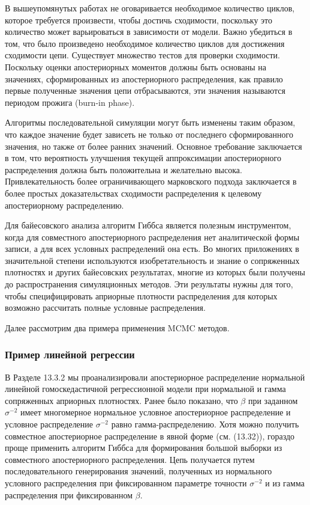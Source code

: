 В вышеупомянутых работах не оговаривается необходимое количество циклов, которое требуется произвести, чтобы достичь сходимости, поскольку это количество может варьироваться в зависимости от модели. Важно убедиться в том, что было произведено необходимое количество циклов для достижения сходимости цепи. Существует множество тестов для проверки  сходимости. Поскольку оценки апостериорных моментов должны быть основаны на значениях, сформированных из апостериорного распределения, как правило первые полученные значения цепи отбрасываются, эти значения называются периодом прожига (burn-in phase).

Алгоритмы последовательной симуляции могут быть изменены таким образом, что каждое значение будет зависеть не только от последнего сформированного значения, но также от более ранних значений. Основное требование заключается в том, что вероятность улучшения текущей аппроксимации апостериорного распределения должна быть положительна и желательно высока. Привлекательность более ограничивающего марковского подхода заключается в более простых доказательствах сходимости  распределения к целевому апостериорному распределению.

Для байесовского анализа алгоритм Гиббса является полезным инструментом, когда для совместного апостериорного распределения нет аналитической формы записи, а для всех условных распределений она есть. Во многих приложениях в значительной степени используются изобретательность и знание о сопряженных плотностях и других байесовских результатах, многие  из которых были получены до распространения симуляционных методов. Эти результаты нужны для того, чтобы специфицировать априорные плотности распределения для которых возможно рассчитать полные условные распределения. 

Далее рассмотрим два примера применения MCMC методов.

\subsubsection*{Пример линейной регрессии}

В Разделе 13.3.2 мы проанализировали апостериорное распределение нормальной линейной гомоскедастичной регрессионной модели при нормальной и гамма сопряженных априорных плотностях. Ранее было показано, что $\beta$ при заданном $\sigma^{-2}$ имеет многомерное нормальное условное апостериорное распределение и условное распределение $\sigma^{-2}$ равно гамма-распределению. Хотя можно получить совместное апостериорное  распределение  в явной форме (см. (13.32)), гораздо проще применить алгоритм Гиббса для формирования большой выборки из совместного апостериорного распределения. Цепь получается путем последовательного генерирования  значений, полученных из нормального условного распределения при фиксированном  параметре точности $\sigma^{-2}$ и из гамма распределения при фиксированном $\beta$.

